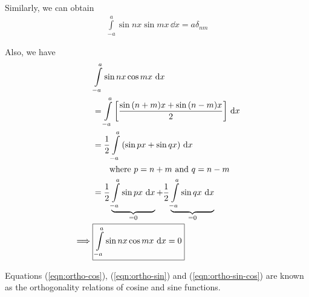         Similarly, we can obtain
        \begin{align}
            \boxed{\int\limits_{-a}^{a}{\sin{nx}\sin{mx}\,\dd{x}}=a\delta_{nm}} \label{eqn:ortho-sin}
        \end{align}

        Also, we have
        \begin{align}
            &\int\limits_{-a}^{a}{\sin{nx}\cos{mx}\,\dd{x}} \nonumber\\
            &=\int\limits_{-a}^{a}{\qty[\dfrac{\sin{(n+m)x}+\sin{(n-m)x}}{2}]\,\dd{x}} \nonumber\\
            &=\dfrac{1}{2}\int\limits_{-a}^{a}{\qty(\sin{px}+\sin{qx})\,\dd{x}} \nonumber\\
            &\qquad\text{where }p=n+m\text{ and }q=n-m \nonumber\\
            &=\dfrac{1}{2}\underbrace{\int\limits_{-a}^{a}{\sin{px}\,\dd{x}}}_{=0}+\dfrac{1}{2}\underbrace{\int\limits_{-a}^{a}{\sin{qx}\,\dd{x}}}_{=0} \nonumber\\
            \implies&\boxed{\int\limits_{-a}^{a}{\sin{nx}\cos{mx}\,\dd{x}}=0} \label{eqn:ortho-sin-cos}
        \end{align}

        Equations (\ref{eqn:ortho-cos}), (\ref{eqn:ortho-sin}) and (\ref{eqn:ortho-sin-cos}) are known as the orthogonality relations of cosine and sine functions.        